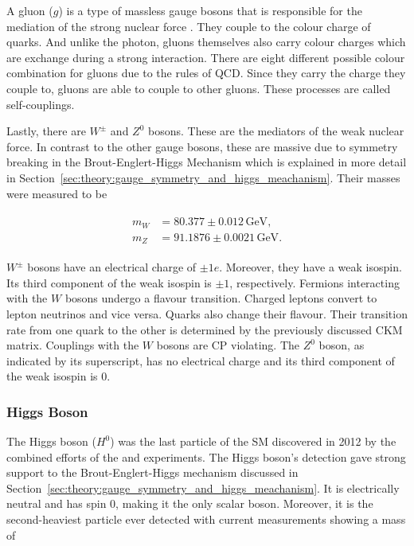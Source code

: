 \documentclass[bachelor,ngerman,english]{GAUBM}
\begin{document}
A gluon ($g$) is a type of massless gauge bosons that is responsible for the mediation of the strong nuclear force \cite{theory:qcd_01}. They couple to the colour charge of quarks. And unlike the photon, gluons themselves also carry colour charges which are exchange during a strong interaction. There are eight different possible colour combination for gluons due to the rules of QCD. Since they carry the charge they couple to, gluons are able to couple to other gluons. These processes are called self-couplings.

Lastly, there are $W^\pm$ and $Z^0$ bosons. These are the mediators of the weak nuclear force. In contrast to the other gauge bosons, these are massive due to symmetry breaking in the Brout-Englert-Higgs Mechanism which is explained in more detail in Section~\ref{sec:theory:gauge_symmetry_and_higgs_meachanism}. Their masses were measured to be \cite{pdg}

\begin{gather}
    \begin{aligned}
        m_W &= 80.377\pm0.012\,\text{GeV},\\
        m_Z &= 91.1876\pm0.0021\,\text{GeV}. 
        \label{eq:mass_wz}
    \end{aligned}
\end{gather}

$W^\pm$ bosons have an electrical charge of $\pm1e$. Moreover, they have a weak isospin. Its third component of the weak isospin is $\pm1$, respectively. Fermions interacting with the $W$ bosons undergo a flavour transition. Charged leptons convert to lepton neutrinos and vice versa. Quarks also change their flavour. Their transition rate from one quark to the other is determined by the previously discussed CKM matrix. Couplings with the $W$ bosons are CP violating. The $Z^0$ boson, as indicated by its superscript, has no electrical charge and its third component of the weak isospin is 0. 

\subsubsection*{Higgs Boson}
The Higgs boson ($H^0$) was the last particle of the SM discovered in 2012 by the combined efforts of the \atlas \cite{theory:higgs_discovery_01} and \cms \cite{theory:higgs_discovery_02} experiments. The Higgs boson's detection gave strong support to the Brout-Englert-Higgs mechanism discussed in Section~\ref{sec:theory:gauge_symmetry_and_higgs_meachanism}. It is electrically neutral and has spin 0, making it the only scalar boson. Moreover, it is the second-heaviest particle ever detected with current measurements \cite{pdg} showing a mass of 
\end{document}

